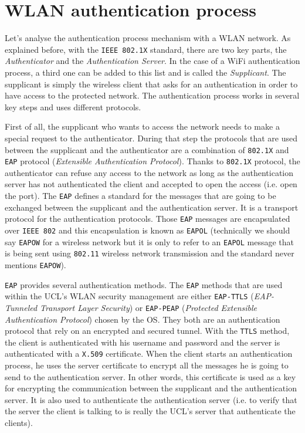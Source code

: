 \section{WLAN authentication process}
Let's analyse the authentication process mechanism with a WLAN network.
As explained before, with the \texttt{IEEE 802.1X} standard, there are two key parts, the \textit{Authenticator} and the \textit{Authentication Server}. In the case of a WiFi authentication process, a third one can be added to this list and is called the \textit{Supplicant}. The supplicant is simply the wireless client that asks for an authentication in order to have access to the protected network. The authentication process works in several key steps and uses different protocols.

First of all, the supplicant who wants to access the network needs to make a special request to the authenticator. During that step the protocols that are used between the supplicant and the authenticator are a combination of \texttt{802.1X} and \texttt{EAP} protocol (\textit{Extensible Authentication Protocol}). Thanks to \texttt{802.1X} protocol, the authenticator can refuse any access to the network as long as the authentication server has not authenticated the client and accepted to open the access (i.e. open the port). The \texttt{EAP} defines a standard for the messages that are going to be exchanged between the supplicant and the authentication server. It is a  transport protocol for the authentication protocols. Those \texttt{EAP} messages are encapsulated over \texttt{IEEE 802} and this encapsulation is known as \texttt{EAPOL} (technically we should say \texttt{EAPOW} for a wireless network but it is only to refer to an \texttt{EAPOL} message that is being sent using \texttt{802.11} wireless network transmission and the standard never mentions \texttt{EAPOW}).

\texttt{EAP} provides several authentication methods. The \texttt{EAP} methods that are used within the UCL's WLAN  security management are either \texttt{EAP-TTLS} (\textit{EAP-Tunneled Transport Layer Security}) or \texttt{EAP-PEAP} (\textit{Protected Extensible Authentication Protocol}) chosen by the OS. They both are an authentication protocol that rely on an encrypted and secured tunnel. With the \texttt{TTLS} method, the client is authenticated with his username and password and the server is authenticated with a \texttt{X.509} certificate. When the client starts an authentication process, he uses the server certificate to encrypt all the messages he is going to send to the authentication server. In other words, this certificate is used as a key for encrypting the communication between the supplicant and the authentication server. It is also used to authenticate the authentication server (i.e. to verify that the server the client is talking to is really the UCL's server that authenticate the clients).


